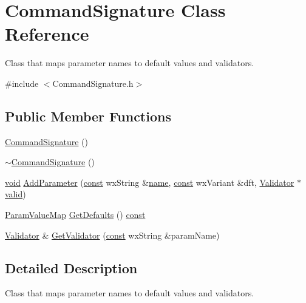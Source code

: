 \hypertarget{class_command_signature}{}\section{Command\+Signature Class Reference}
\label{class_command_signature}


Class that maps parameter names to default values and validators.  




{\ttfamily \#include $<$Command\+Signature.\+h$>$}

\subsection*{Public Member Functions}
\begin{DoxyCompactItemize}
\item 
\hyperlink{class_command_signature_a431f12c8f433b2e77dad4a8cf7e39db5}{Command\+Signature} ()
\item 
\hyperlink{class_command_signature_aa03cca652a40e6c585fbf3b4abcfc926}{$\sim$\+Command\+Signature} ()
\item 
\hyperlink{sound_8c_ae35f5844602719cf66324f4de2a658b3}{void} \hyperlink{class_command_signature_a8a906a6cb0cdc3c732b2a7f196146a49}{Add\+Parameter} (\hyperlink{getopt1_8c_a2c212835823e3c54a8ab6d95c652660e}{const} wx\+String \&\hyperlink{lib_2expat_8h_a1b49b495b59f9e73205b69ad1a2965b0}{name}, \hyperlink{getopt1_8c_a2c212835823e3c54a8ab6d95c652660e}{const} wx\+Variant \&dft, \hyperlink{class_validator}{Validator} $\ast$\hyperlink{test__lib_f_l_a_c_2format_8c_a06a21e13831b421c471dde0792924a2d}{valid})
\item 
\hyperlink{_command_misc_8h_ad01459a1b8a985ee81cde47239806288}{Param\+Value\+Map} \hyperlink{class_command_signature_a6fc90f8b6129d88bee681510993b8cb8}{Get\+Defaults} () \hyperlink{getopt1_8c_a2c212835823e3c54a8ab6d95c652660e}{const} 
\item 
\hyperlink{class_validator}{Validator} \& \hyperlink{class_command_signature_add826a2917a1c88c75a65c0c74021b88}{Get\+Validator} (\hyperlink{getopt1_8c_a2c212835823e3c54a8ab6d95c652660e}{const} wx\+String \&param\+Name)
\end{DoxyCompactItemize}


\subsection{Detailed Description}
Class that maps parameter names to default values and validators. 

